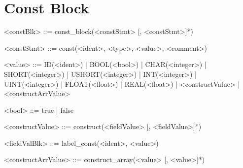 \documentclass{article}
\begin{document}
\section{Const Block}
\begin{grammar} \small

<constBlk> ::= const_block(<constStmt> [, <constStmt>]*)

<constStmt> ::= const(<ident>, <type>, <value>, <comment>)

<value> ::= ID(<ident>) | BOOL(<bool>) | CHAR(<integer>) | SHORT(<integer>) | USHORT(<integer>) |
            INT(<integer>) | UINT(<integer>) | FLOAT(<float>) | REAL(<float>) |
            <constructValue> | <constructArrValue>

<bool> ::= true | false

<constructValue> ::= construct(<fieldValue> [, <fieldValue>]*)

<fieldValBlk> ::= label_const(<ident>, <value>)

<constructArrValue> ::= construct_array(<value> [, <value>]*)

\end{grammar}
\end{document}
